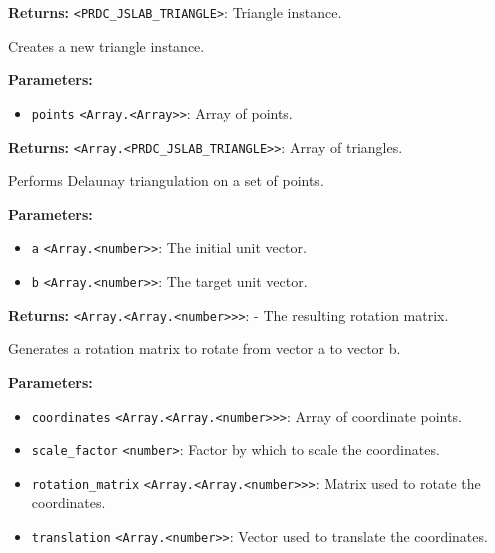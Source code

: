 \documentclass[12pt,a4paper]{article}
\begin{document}
\noindent \textbf{Returns:} \texttt{<PRDC\_JSLAB\_TRIANGLE>}: Triangle instance.

\noindent Creates a new triangle instance.

\vspace{5mm}
\noindent {}


\noindent \textbf{Parameters:}
\begin{itemize}
  \item \texttt{points} \texttt{<Array.<Array>>}: Array of points.
\end{itemize}

\noindent \textbf{Returns:} \texttt{<Array.<PRDC\_JSLAB\_TRIANGLE>>}: Array of triangles.

\noindent Performs Delaunay triangulation on a set of points.

\vspace{5mm}
\noindent {}


\noindent \textbf{Parameters:}
\begin{itemize}
  \item \texttt{a} \texttt{<Array.<number>>}: The initial unit vector.
  \item \texttt{b} \texttt{<Array.<number>>}: The target unit vector.
\end{itemize}

\noindent \textbf{Returns:} \texttt{<Array.<Array.<number>>>}: - The resulting rotation matrix.

\noindent Generates a rotation matrix to rotate from vector a to vector b.

\vspace{5mm}
\noindent {}


\noindent \textbf{Parameters:}
\begin{itemize}
  \item \texttt{coordinates} \texttt{<Array.<Array.<number>>>}: Array of coordinate points.
  \item \texttt{scale\_factor} \texttt{<number>}: Factor by which to scale the coordinates.
  \item \texttt{rotation\_matrix} \texttt{<Array.<Array.<number>>>}: Matrix used to rotate the coordinates.
  \item \texttt{translation} \texttt{<Array.<number>>}: Vector used to translate the coordinates.
\end{itemize}
\end{document}
